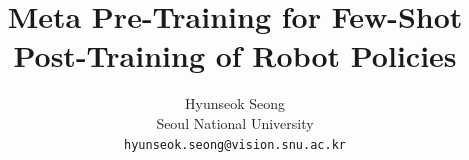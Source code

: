 \documentclass[10pt,twocolumn,letterpaper]{article}
\title{Meta Pre-Training for Few-Shot Post-Training of Robot Policies}
\author{Hyunseok Seong\\
Seoul National University\\
{\tt\small hyunseok.seong@vision.snu.ac.kr}
}
\begin{document}
\maketitle






{
    \small
    
    
}
\end{document}
